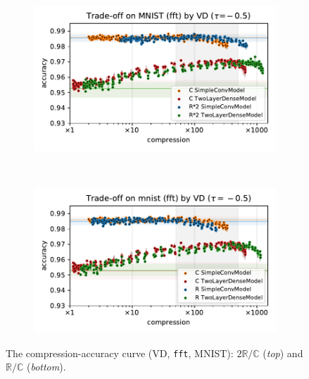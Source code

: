 \documentclass[a4paper,10pt,onecolumn]{article}
\newcommand{\real}{\mathbb{R}}
\newcommand{\cplx}{\mathbb{C}}
\begin{document}
\begin{figure}[!t]
  \centering
  \begin{subfigure}[b]{1.\columnwidth}  %
    \centering
    \includegraphics[width=\columnwidth]{figure__mnist-like__trade-off/appendix__cmp__VD__mnist__fft__-0.5.pdf}
  \end{subfigure} \\%
  \begin{subfigure}[b]{1.\columnwidth}  %
    \centering
    \includegraphics[width=\columnwidth]{figure__mnist-like__trade-off/appendix__VD__mnist__fft__-0.5.pdf}
  \end{subfigure}
  \caption{%
    The compression-accuracy curve (VD, \texttt{fft}, MNIST):
    $2 \real / \cplx$ (\textit{top}) and $\real / \cplx$ (\textit{bottom}).
  }
  \label{fig:mnist-like__trade-off__fft}
\end{figure}
\end{document}
